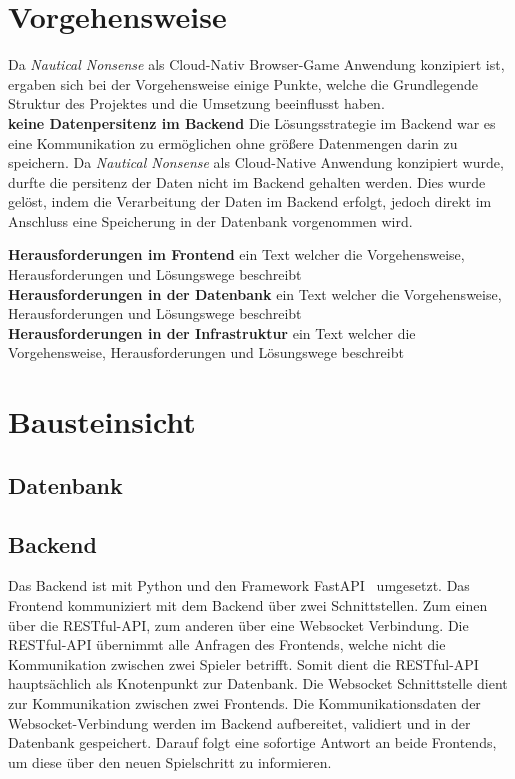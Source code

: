 \documentclass[a4paper, 10pt, conference]{IEEEtran}
\begin{document}
\section{Vorgehensweise}\label{sec:vorgehensweise}
Da \textit{Nautical Nonsense} als Cloud-Nativ Browser-Game Anwendung konzipiert ist, ergaben sich bei der Vorgehensweise einige Punkte, welche die Grundlegende Struktur des Projektes und die Umsetzung beeinflusst haben.\\

\textbf{keine Datenpersitenz im Backend} Die Lösungsstrategie im Backend war es eine Kommunikation zu ermöglichen ohne größere Datenmengen darin zu speichern. Da \textit{Nautical Nonsense} als Cloud-Native Anwendung konzipiert wurde, durfte die persitenz der Daten nicht im Backend gehalten werden. Dies wurde gelöst, indem die Verarbeitung der Daten im Backend erfolgt, jedoch direkt im Anschluss eine Speicherung in der Datenbank vorgenommen wird. 

\textbf{Herausforderungen im Frontend} 
ein Text welcher die Vorgehensweise, Herausforderungen und Lösungswege beschreibt\\
\textbf{Herausforderungen in der Datenbank} 
ein Text welcher die Vorgehensweise, Herausforderungen und Lösungswege beschreibt\\
\textbf{Herausforderungen in der Infrastruktur} 
ein Text welcher die Vorgehensweise, Herausforderungen und Lösungswege beschreibt\\

\section{Bausteinsicht}\label{sec:bausteinsicht}



\subsection{Datenbank}\label{subsec:datenbank}



\subsection{Backend}\label{subsec:backend}
Das Backend ist mit Python und den Framework FastAPI~\cite{fastapi} umgesetzt. Das Frontend kommuniziert mit dem Backend über zwei Schnittstellen. Zum einen über die RESTful-API, zum anderen über eine Websocket Verbindung. Die RESTful-API übernimmt alle Anfragen des Frontends, welche nicht die Kommunikation zwischen zwei Spieler betrifft. Somit dient die RESTful-API hauptsächlich als Knotenpunkt zur Datenbank. Die Websocket Schnittstelle dient zur Kommunikation zwischen zwei Frontends. Die Kommunikationsdaten der Websocket-Verbindung werden im Backend aufbereitet, validiert und in der Datenbank gespeichert. Darauf folgt eine sofortige Antwort an beide Frontends, um diese über den neuen Spielschritt zu informieren.
\end{document}
